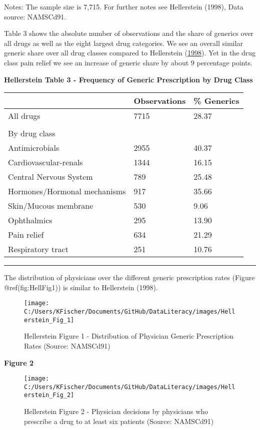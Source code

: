 \documentclass[
]{book}
\begin{document}
Notes: The sample size is 7,715. For further notes see Hellerstein
(1998), Data source: NAMSCd91.

Table 3 shows the absolute number of observations and the share of
generics over all drugs as well as the eight largest drug categories. We
see an overall similar generic share over all drug classes compared to
Hellerstein (\protect\hyperlink{ref-hellerstein_importance_1998}{1998}).
Yet in the drug class pain relief we see an increase of generic share by
about \(9\) percentage points.

\textbf{Hellerstein Table 3 - Frequency of Generic Prescription by Drug
Class}

\begin{longtable}[]{@{}lll@{}}
\toprule
& Observations & \% Generics\tabularnewline
\midrule
\endhead
All drugs & 7715 & 28.37\tabularnewline
& &\tabularnewline
By drug class & &\tabularnewline
Antimicrobials & 2955 & 40.37\tabularnewline
Cardiovascular-renals & 1344 & 16.15\tabularnewline
Central Nervous System & 789 & 25.48\tabularnewline
Hormones/Hormonal mechanisms & 917 & 35.66\tabularnewline
Skin/Mucous membrane & 530 & 9.06\tabularnewline
Ophthalmics & 295 & 13.90\tabularnewline
Pain relief & 634 & 21.29\tabularnewline
Respiratory tract & 251 & 10.76\tabularnewline
\bottomrule
\end{longtable}

\begin{center}\rule{0.5\linewidth}{0.5pt}\end{center}

The distribution of physicians over the different generic prescription
rates (Figure @ref(fig:HellFig1)) is similar to Hellerstein (1998).

\begin{figure}

{\centering \texttt{[image: C:/Users/KFischer/Documents/GitHub/DataLiteracy/images/Hellerstein\_Fig\_1]} 

}

\caption{Hellerstein Figure 1 - Distribution of Physician Generic Prescription Rates (Source: NAMSCd91)}\label{fig:HellFigR1}
\end{figure}

\textbf{Figure 2}

\begin{figure}

{\centering \texttt{[image: C:/Users/KFischer/Documents/GitHub/DataLiteracy/images/Hellerstein\_Fig\_2]} 

}

\caption{Hellerstein Figure 2 - Physician decisions by physicians who prescribe a drug to at least six patients (Source: NAMSCd91)}\label{fig:HellFigR2}
\end{figure}
\end{document}
